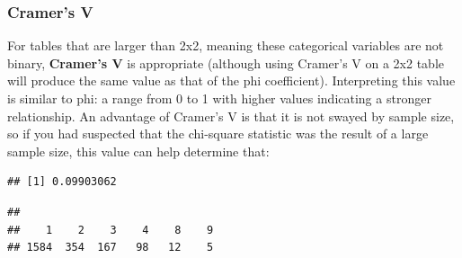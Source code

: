 \documentclass[
]{book}
\newenvironment{Shaded}{\begin{snugshade}}{\end{snugshade}}
\newcommand{\CommentTok}[1]{\textcolor[rgb]{0.56,0.35,0.01}{\textit{#1}}}
\newcommand{\FunctionTok}[1]{\textcolor[rgb]{0.00,0.00,0.00}{#1}}
\newcommand{\NormalTok}[1]{#1}
\newcommand{\SpecialCharTok}[1]{\textcolor[rgb]{0.00,0.00,0.00}{#1}}
\begin{document}
\hypertarget{cramers-v}{%
\subsubsection{Cramer's V}\label{cramers-v}}

For tables that are larger than 2x2, meaning these categorical variables are not binary, \textbf{Cramer's V} is appropriate (although using Cramer's V on a 2x2 table will produce the same value as that of the phi coefficient). Interpreting this value is similar to phi: a range from 0 to 1 with higher values indicating a stronger relationship. An advantage of Cramer's V is that it is not swayed by sample size, so if you had suspected that the chi-square statistic was the result of a large sample size, this value can help determine that:

\begin{Shaded}
\end{Shaded}

\begin{verbatim}
## [1] 0.09903062
\end{verbatim}

\begin{Shaded}
\end{Shaded}

\begin{verbatim}
## 
##    1    2    3    4    8    9 
## 1584  354  167   98   12    5
\end{verbatim}
\end{document}
